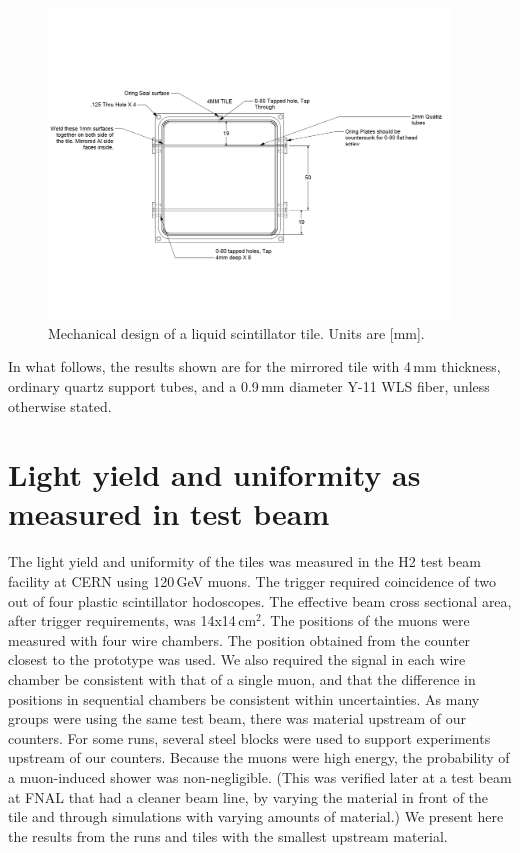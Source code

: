 \documentclass[review]{elsarticle}
\begin{document}
\begin{figure}[!ht]
\begin{center}
\includegraphics[width=0.95\textwidth]{./figures/mechanicaldesign.pdf}
\caption{Mechanical design of a liquid scintillator tile. Units are
  [mm].}
\label{fig:tiledesign}
\end{center}
\end{figure}

In what follows, the results shown are for the mirrored tile with 4\,mm
thickness, ordinary quartz support tubes, and a 0.9\,mm diameter Y-11 WLS fiber,
unless otherwise stated.

\section{Light yield and uniformity as measured in test beam}

The light yield and uniformity of the tiles was measured in the H2
test beam facility at CERN using 120\,GeV muons. The trigger required
coincidence of two out of four plastic scintillator hodoscopes. The
effective beam cross sectional area, after trigger requirements, was
14x14\,cm$^2$. The positions of the muons were measured with four
wire chambers. The position obtained from the counter closest to the
prototype was used. We also required the signal in each wire chamber
be consistent with that of a single muon, and that the difference in
positions in sequential chambers be consistent within uncertainties.
As many groups were using the same test beam, there was material
upstream of our counters. For some runs, several steel blocks were
used to support experiments upstream of our counters. Because the
muons were high energy, the probability of a muon-induced shower was
non-negligible. (This was verified later at a test beam at FNAL that
had a cleaner beam line, by varying the material in front of the tile
and through simulations with varying amounts of material.) We present here the
results from the runs and tiles with the smallest upstream material.
\end{document}
